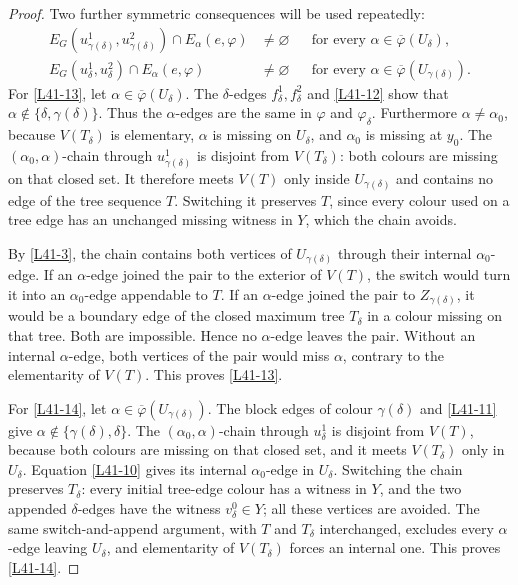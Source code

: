 \documentclass[11pt]{article}
\theoremstyle{definition}
\newcommand{\set}[1]{\{#1\}}
\begin{document}
\begin{proof}
Two further symmetric consequences will be used repeatedly:
\begin{align}
 E_G(u^1_{\gamma(\delta)},u^2_{\gamma(\delta)})
   \cap E_\alpha(e,\varphi)&\ne\varnothing
 &&\text{for every }\alpha\in\overline\varphi(U_\delta),
 \tag{13}\label{L41-13}\\
 E_G(u^1_\delta,u^2_\delta)
   \cap E_\alpha(e,\varphi)&\ne\varnothing
 &&\text{for every }\alpha\in
          \overline\varphi(U_{\gamma(\delta)}).
 \tag{14}\label{L41-14}
\end{align}
For \eqref{L41-13}, let $\alpha\in\overline\varphi(U_\delta)$. The
$\delta$-edges $f^1_\delta,f^2_\delta$ and \eqref{L41-12} show that
$\alpha\notin\set{\delta,\gamma(\delta)}$. Thus the
$\alpha$-edges are the same in $\varphi$ and $\varphi_\delta$.
Furthermore $\alpha\ne\alpha_0$, because $V(T_\delta)$ is elementary,
$\alpha$ is missing on $U_\delta$, and $\alpha_0$ is missing at $y_0$.
The $(\alpha_0,\alpha)$-chain through
$u^1_{\gamma(\delta)}$ is disjoint from $V(T_\delta)$: both colours are
missing on that closed set. It therefore meets $V(T)$ only inside
$U_{\gamma(\delta)}$ and contains no edge of the tree sequence $T$.
Switching it preserves $T$, since every colour used on a tree edge has an
unchanged missing witness in $Y$, which the chain avoids.

By \eqref{L41-3}, the chain contains both vertices of
$U_{\gamma(\delta)}$ through their internal $\alpha_0$-edge. If an
$\alpha$-edge joined the pair to the exterior of $V(T)$, the switch would
turn it into an $\alpha_0$-edge appendable to $T$. If an $\alpha$-edge
joined the pair to $Z_{\gamma(\delta)}$, it would be a boundary edge of the
closed maximum tree $T_\delta$ in a colour missing on that tree. Both are
impossible. Hence no $\alpha$-edge leaves the pair. Without an internal
$\alpha$-edge, both vertices of the pair would miss $\alpha$, contrary to
the elementarity of $V(T)$. This proves \eqref{L41-13}.

For \eqref{L41-14}, let
$\alpha\in\overline\varphi(U_{\gamma(\delta)})$. The block edges of colour
$\gamma(\delta)$ and \eqref{L41-11} give
$\alpha\notin\set{\gamma(\delta),\delta}$. The
$(\alpha_0,\alpha)$-chain through $u^1_\delta$ is disjoint from $V(T)$,
because both colours are missing on that closed set, and it meets
$V(T_\delta)$ only in $U_\delta$. Equation \eqref{L41-10} gives its
internal $\alpha_0$-edge in $U_\delta$. Switching the chain preserves
$T_\delta$: every initial tree-edge colour has a witness in $Y$, and the
two appended $\delta$-edges have the witness $v^0_\delta\in Y$; all these
vertices are avoided. The same switch-and-append argument, with
$T$ and $T_\delta$ interchanged, excludes every $\alpha$-edge leaving
$U_\delta$, and elementarity of $V(T_\delta)$ forces an internal one. This
proves \eqref{L41-14}.


\end{proof}
\end{document}
